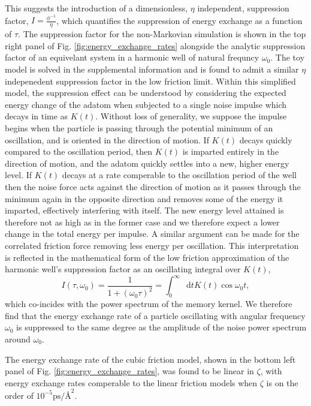 \documentclass[7pt]{article}
\newcommand*{\diff}{\mathop{}\!\mathrm{d}}
\newcommand{\uzeta}{\si{\pico\second\per\angstrom\squared}}
\begin{document}
This suggests the introduction of a dimensionless, $\eta$ independent, suppression factor, $I = \frac{\phi^{-1}}{\eta}$, which quantifies the suppression of energy exchange as a function of $\tau$. The suppression factor for the non-Markovian simulation is shown in the top right panel of Fig. \ref{fig:energy_exchange_rates} alongside the analytic suppression factor of an equivelant system in a harmonic well of natural frequncy $\omega_0$. The toy model is solved in the supplemental information and is found to admit a similar $\eta$ indepenedent suppression factor in the low friction limit. Within this simplified model, the suppression effect can be understood by considering the expected energy change of the adatom when subjected to a single noise impulse which decays in time as $K(t)$. Without loss of generality, we suppose the impulse begins when the particle is passing through the potential minimum of an oscillation, and is oriented in the direction of motion. If $K(t)$ decays quickly compared to the oscillation period, then $K(t)$ is imparted entirely in the direction of motion, and the adatom quickly settles into a new, higher energy level. If $K(t)$ decays at a rate comperable to the oscillation period of the well then the noise force acts against the direction of motion as it passes through the minimum again in the opposite direction and removes some of the energy it imparted, effectively interfering with itself. The new energy level attained is therefore not as high as in the former case and we therefore expect a lower change in the total energy per impulse. A similar argument can be made for the correlated friction force removing less energy per oscillation. This interpretation is reflected in the mathematical form of the low friction approximation of the harmonic well's suppression factor as an oscillating integral over $K(t)$,
$$
$$
\begin{equation}
	I(\tau, \omega_0) = \frac{1}{1+\left(\omega_0\tau\right)^2} = \int_0^{\infty}\diff{t}K(t)\cos{\omega_0t},
	\label{eq:suppression_factor}
\end{equation}
which co-incides with the power spectrum of the memory kernel. We therefore find that the energy exchange rate of a particle oscillating with angular frequency $\omega_0$ is suppressed to the same degree as the amplitude of the noise power spectrum around $\omega_0$. 

The energy exchange rate of the cubic friction model, shown in the bottom left panel of Fig. \ref{fig:energy_exchange_rates}, was found to be linear in $\zeta$, with energy exchange rates comperable to the linear friction models when $\zeta$ is on the order of $10^{-5}\uzeta$.
\end{document}
